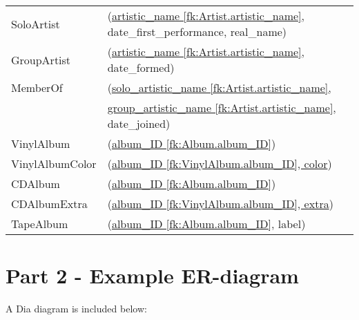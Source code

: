 \documentclass[11pt,a4paper]{article}
\begin{document}
\begin{table}[h]
\begin{tabular}{ll}
SoloArtist  & (\underline{artistic\_name [fk:Artist.artistic\_name]}, 
	            date\_first\_performance, real\_name) \\

GroupArtist	& (\underline{artistic\_name [fk:Artist.artistic\_name]},
              date\_formed) \\

MemberOf    & (\underline{solo\_artistic\_name [fk:Artist.artistic\_name], }\\
            & \underline{group\_artistic\_name [fk:Artist.artistic\_name]},
              date\_joined)\\
 
VinylAlbum  &  (\underline{album\_ID [fk:Album.album\_ID]}) \\

VinylAlbumColor & (\underline{album\_ID [fk:VinylAlbum.album\_ID], color}) \\

CDAlbum  & (\underline{album\_ID [fk:Album.album\_ID]}) \\

CDAlbumExtra & (\underline{album\_ID [fk:VinylAlbum.album\_ID], extra}) \\

TapeAlbum & (\underline{album\_ID [fk:Album.album\_ID]}, label) 
\end{tabular}
\end{table}


\section{Part 2 - Example ER-diagram}

A Dia diagram is included below:

\end{document}
